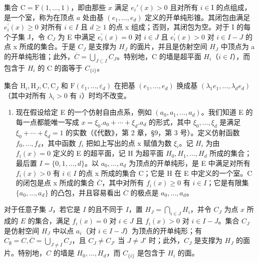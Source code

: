 集合 \(\mathrm{C} = \mathrm{F}(1, \ldots, 1)\)，即由那些 \(x\) 满足 \(e_i'(x) > 0\) 且对所有 \(i \in \mathrm{I}\) 的点组成，是一个室，称为在顶点 \(a\) 处由基 \((e_{1},\ldots,e_{d})\) 定义的开单纯形锥。其闭包由满足 \(e_{i}^{\prime}(x)\geqslant0\) 对所有 \(i\in I\) 且 \(d\geqslant1\) 的点 x 组成；否则，其闭包为空。对于 I 的每个子集 J，令 \(C_{J}\) 为 E 中满足 \(e_{i}^{\prime}(x)=0\) 对 \(i\in J\) 且 \(e_{i}^{\prime}(x)>0\) 对 \(i\in I-J\) 的点 x 所成的集合。于是 \(C_{J}\) 是支撑为 \(H_{J}\) 的面片，并且是仿射空间 \(H_{J}\) 中顶点为 a 的开单纯形锥；此外，\(\overline{C}=\bigcup_{J\subset I}C_{J}\)。特别地，C 的墙是超平面 \(H_{i}\)（\(i\in I\)），而包含于 \(H_{i}\) 的 C 的面等于 \(C_{\{i\}}\)。

集合 \(\mathrm{H}_i, \mathrm{H}_J, \mathrm{C}, \mathrm{C}_J\) 和 \(\mathrm{F}(\varepsilon_1, \ldots, \varepsilon_d)\) 在把基 \((e_1, \ldots, e_d)\) 换成基 \((\lambda_1 e_1, \ldots, \lambda_d e_d)\)（其中对所有 \(\lambda_i > 0\) 有 \(i\)）时均不改变。

\begin{enumerate}
\def\labelenumi{\alph{enumi})}
\setcounter{enumi}{1}
\tightlist
\item
  现在假设给定 E 的一个仿射自由点系，例如 \((a_{0}, a_{1}, \ldots, a_{d})\)。我们知道 E 的每一点都能唯一写成 \(x = \xi_{0}.a_{0} + \cdots + \xi_{d}.a_{d}\) 的形式，其中 \(\xi_{0}, \ldots, \xi_{d}\) 是满足 \(\xi_{0} + \cdots + \xi_{d} = 1\) 的实数（《代数》，第 2 章，§9，第 3 号）。定义仿射函数 \(f_{0}, \ldots, f_{d}\)，其中函数 \(f_{i}\) 把如上写出的点 x 赋值为数 \(\xi_{i}\)。记 \(H_{i}\) 为由 \(f_{i}(x) = 0\) 定义的 E 的超平面，记 H 为超平面 \(H_{0}, H_{1}, \ldots, H_{d}\) 所成的集合；最后置 \(I = \{0, 1, \ldots, d\}\)。以 \(a_{0}, \ldots, a_{d}\) 为顶点的开单纯形，是 E 中满足对所有 \(f_{i}(x) > 0\) 有 \(i \in I\) 的点 x 所成的集合 C；它是 H 在 E 中定义的一个室。C 的闭包是点 x 所成的集合 \(\overline{C}\)，其中对所有 \(f_{i}(x) \geqslant 0\) 有 \(i \in I\)；它是有限集 \(\{a_{0}, \ldots, a_{d}\}\) 的凸包，并且容易看出 \(\overline{C}\) 的极点是 \(a_{0}, \ldots, a_{d}\)。
\end{enumerate}

对于任意子集 \(J\)，若它是 \(I\) 的且不同于 \(I\)，置 \(H_J = \bigcap_{i \in J} H_i\)，并令 \(C_J\) 为点 \(x\) 所成的 \(E\) 的集合，满足 \(f_i(x) = 0\) 对 \(i \in J\) 且 \(f_i(x) > 0\) 对 \(i \in I - J\)。集合 \(C_J\) 是仿射空间 \(H_J\) 中以点 \(a_i\)（对 \(i \in I - J\)）为顶点的开单纯形；有 \(C_\emptyset = C, \overline{C} = \bigcup_{J \neq I} C_J\)，且 \(C_J \neq C_{J'}\) 当 \(J \neq J'\) 时；此外，\(C_J\) 是支撑为 \(H_J\) 的面片。特别地，\(C\) 的墙是 \(H_0, \ldots, H_d\)，而 \(C_{\{i\}}\) 是包含于 \(H_i\) 的面。

